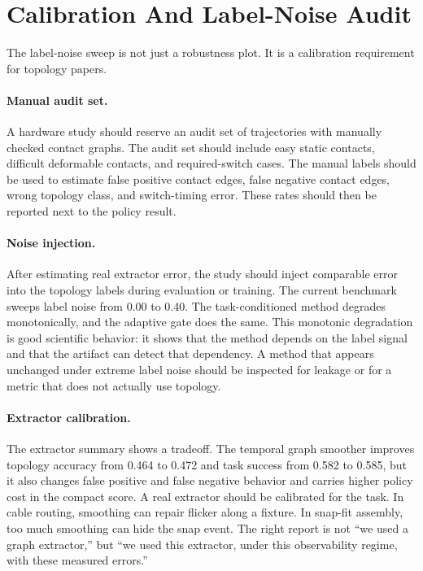 \documentclass{article}
\begin{document}
\section{Calibration And Label-Noise Audit}

The label-noise sweep is not just a robustness plot. It is a calibration requirement for topology papers.

\paragraph{Manual audit set.}
A hardware study should reserve an audit set of trajectories with manually checked contact graphs. The audit set should include easy static contacts, difficult deformable contacts, and required-switch cases. The manual labels should be used to estimate false positive contact edges, false negative contact edges, wrong topology class, and switch-timing error. These rates should then be reported next to the policy result.

\paragraph{Noise injection.}
After estimating real extractor error, the study should inject comparable error into the topology labels during evaluation or training. The current benchmark sweeps label noise from 0.00 to 0.40. The task-conditioned method degrades monotonically, and the adaptive gate does the same. This monotonic degradation is good scientific behavior: it shows that the method depends on the label signal and that the artifact can detect that dependency. A method that appears unchanged under extreme label noise should be inspected for leakage or for a metric that does not actually use topology.

\paragraph{Extractor calibration.}
The extractor summary shows a tradeoff. The temporal graph smoother improves topology accuracy from 0.464 to 0.472 and task success from 0.582 to 0.585, but it also changes false positive and false negative behavior and carries higher policy cost in the compact score. A real extractor should be calibrated for the task. In cable routing, smoothing can repair flicker along a fixture. In snap-fit assembly, too much smoothing can hide the snap event. The right report is not ``we used a graph extractor,'' but ``we used this extractor, under this observability regime, with these measured errors.''
\end{document}
